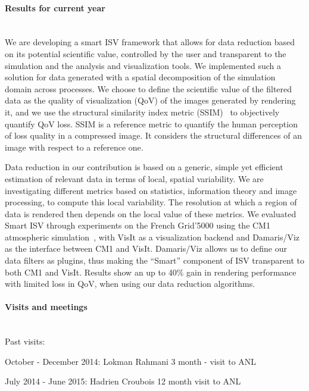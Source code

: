 \begin{refsection}[report2015_tp]
\paragraph{Results for current year}~\\

We are developing a smart ISV framework that allows for data reduction based on its
potential scientific value, controlled by the user and transparent to the simulation and the
analysis and visualization tools. We implemented such a solution for data generated with a spatial
decomposition of the simulation domain across processes. We choose to define the scientific
value of the filtered data as the quality of visualization (QoV) of the images generated by
rendering it, and we use the structural similarity index metric (SSIM)~\cite{ssim} to objectively
quantify QoV loss. SSIM is a reference metric to quantify the human perception of loss quality
in a compressed image. It considers the structural differences of an image with respect to a
reference one.

Data reduction in our contribution is based on a generic, simple yet efficient estimation of
relevant data in terms of local, spatial variability. We are investigating different metrics
based on statistics, information theory and image processing, to compute this local
variability. The resolution at which a region of data is rendered then depends on the local
value of these metrics.  We evaluated Smart ISV through experiments on the French Grid’5000
using the CM1 atmospheric simulation~\cite{Bryan:2002}, with VisIt as a visualization backend
and Damaris/Viz as the interface between CM1 and VisIt. Damaris/Viz allows us to define our
data filters as plugins, thus making the “Smart” component of ISV transparent to both CM1 and
VisIt.  Results show an up to 40\% gain in rendering performance with limited loss in QoV, when
using our data reduction algorithms.

\paragraph{Visits and meetings}~\\

Past visits:
\begin{itemize*}
\item October - December 2014: Lokman Rahmani 3 month - visit to ANL
\item July 2014 - June 2015: Hadrien Croubois 12 month visit to ANL
\end{itemize*}


\end{refsection}
